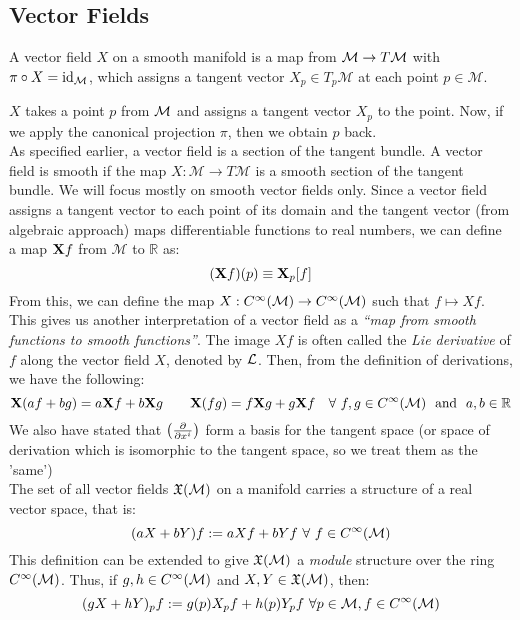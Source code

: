 \subsection{Vector Fields}
\begin{definition}
  A vector field $X$ on a smooth manifold is a map from $\mathcal M \rightarrow T\mathcal M$ with $\pi\circ X = \mathrm{id}_\mathcal M$, which assigns a tangent vector $X_p\in T_p\mathcal{M}$ at each point $p\in \mathcal{M}$.
\end{definition}
$X$ takes a point $p$ from $\mathcal M$ and assigns a tangent vector $X_p$ to the point. Now, if we apply the canonical projection $\pi$, then we obtain $p$ back.\\[0.2cm]
As specified earlier, a vector field is a section of the tangent bundle. A vector field is smooth if the map $X: \mathcal{M}\rightarrow T\mathcal{M}$ is a smooth section of the tangent bundle. We will focus mostly on smooth vector fields only. Since a vector field assigns a tangent vector to each point of its domain and the tangent vector (from algebraic approach) maps differentiable functions to real numbers, we can define a map $\boldsymbol{\mathbf{X}}f$ from $\mathcal{M}$ to $\mathbb{R}$ as: 
$$(\boldsymbol{\mathbf{X}}f)(p) \equiv\boldsymbol{\mathbf{X}}_p[f]$$
From this, we can define the map $X: C^\infty(\mathcal M) \rightarrow C^\infty(\mathcal M)$ such that $f\mapsto Xf$. This gives us another interpretation of a vector field as a \textit{``map from smooth functions to smooth functions''}. The image $Xf$ is often called the \textit{Lie derivative} of $f$ along the vector field $X$, denoted by $\mathcal L$. 
Then, from the definition of derivations, we have the following:
$$\boldsymbol{\mathbf{X}}(af+bg)=a\boldsymbol{\mathbf{X}}f + b\boldsymbol{\mathbf{X}}g \quad \quad \boldsymbol{\mathbf{X}}(fg) = f\boldsymbol{\mathbf{X}}g + g\boldsymbol{\mathbf{X}}f\quad \forall \ f,g \in C^\infty(\mathcal{M}) \ \ \text{and}\ \ a,b\in\mathbb{R}$$
We also have stated that $\left( \pdv{x^i} \right)$ form a basis for the tangent space (or space of derivation which is isomorphic to the tangent space, so we treat them as the 'same')\\[0.3cm]
The set of all vector fields $\mathfrak{X}(\mathcal M)$ on a manifold carries a structure of a real vector space, that is:
$$(aX+bY)f := aXf + bYf \ \forall \ f \in C^\infty(\mathcal M)$$
This definition can be extended to give $\mathfrak{X}(\mathcal M)$ a \textit{module} structure over the ring $C^\infty(\mathcal M)$. Thus, if $g,h \in C^\infty(\mathcal M)$ and $X,Y\in \mathfrak{X}(\mathcal M)$, then:
$$(gX+hY)_p f:= g(p)X_pf + h(p)Y_pf\ \forall p\in\mathcal M, f \in C^\infty(\mathcal M)$$

